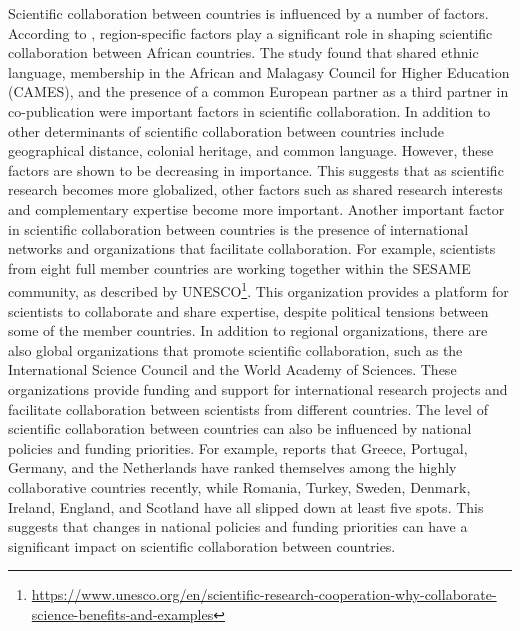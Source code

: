 Scientific collaboration between countries is influenced by a number of factors. According to \cite{dosso2023towards}, region-specific factors play a significant role in shaping scientific collaboration between African countries. The study found that shared ethnic language, membership in the African and Malagasy Council for Higher Education (CAMES), and the presence of a common European partner as a third partner in co-publication were important factors in scientific collaboration. In addition to other determinants of scientific collaboration between countries include geographical distance, colonial heritage, and common language. However, these factors are shown to be decreasing in importance. This suggests that as scientific research becomes more globalized, other factors such as shared research interests and complementary expertise become more important.
Another important factor in scientific collaboration between countries is the presence of international networks and organizations that facilitate collaboration. For example, scientists from eight full member countries are working together within the SESAME community, as described by UNESCO\footnote{\url{https://www.unesco.org/en/scientific-research-cooperation-why-collaborate-science-benefits-and-examples}}. This organization provides a platform for scientists to collaborate and share expertise, despite political tensions between some of the member countries.
In addition to regional organizations, there are also global organizations that promote scientific collaboration, such as the International Science Council and the World Academy of Sciences. These organizations provide funding and support for international research projects and facilitate collaboration between scientists from different countries.
The level of scientific collaboration between countries can also be influenced by national policies and funding priorities. For example, \cite{hu2020mapping} reports that Greece, Portugal, Germany, and the Netherlands have ranked themselves among the highly collaborative countries recently, while Romania, Turkey, Sweden, Denmark, Ireland, England, and Scotland have all slipped down at least five spots. This suggests that changes in national policies and funding priorities can have a significant impact on scientific collaboration between countries. 

